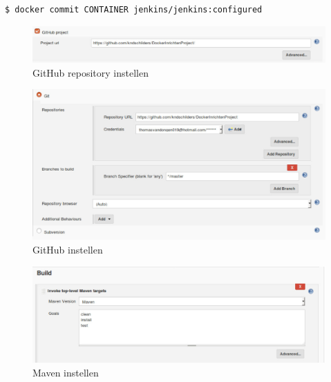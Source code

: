 \documentclass[12pt]{article}
\begin{document}
\begin{lstlisting}[language=Bash]
    $ docker commit CONTAINER jenkins/jenkins:configured
\end{lstlisting}



\begin{figure}[H]
	\begin{center}
		\includegraphics[width=1.0\textwidth]{images/Jenkins-Github.PNG}
		\caption{GitHub repository instellen\label{fig:jenkins_config_repo}}
	\end{center}
\end{figure}

\begin{figure}[H]
	\begin{center}
		\includegraphics[width=1.0\textwidth]{images/Jenkins-Github-2.PNG}
		\caption{GitHub instellen\label{fig:jenkins_config_repo_2}}
	\end{center}
\end{figure}

\begin{figure}[H]
	\begin{center}
		\includegraphics[width=1.0\textwidth]{images/Maven.PNG}
		\caption{Maven instellen\label{fig:jenkins_maven}}
	\end{center}
\end{figure}
\end{document}
